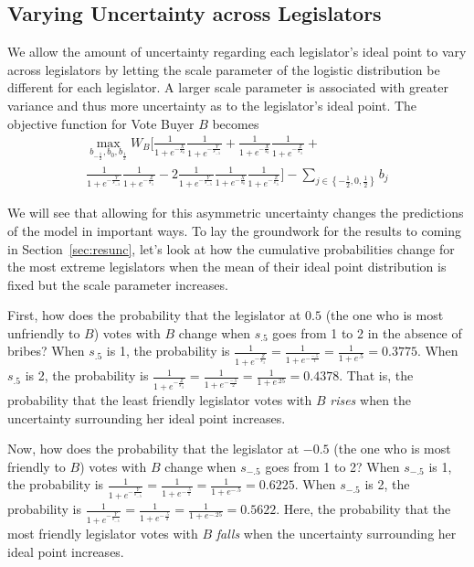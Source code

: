 \documentclass[12pt]{article}
\begin{document}
\subsection{Varying Uncertainty across Legislators}
\label{sec:uncert}
We allow the amount of uncertainty regarding each legislator's ideal point to vary across legislators by letting the scale parameter of the logistic distribution be different for each legislator. A larger scale parameter is associated with greater variance and thus more uncertainty as to the legislator's ideal point. The objective function for Vote Buyer $B$ becomes
 \begin{multline}
    \max_{b_{-\frac{1}{2}}, b_0, b_{\frac{1}{2}}} 
					W_B \biggl[ \frac{1}{1+e^{-\frac{X}{s_0}}} \frac{1}{1+e^{-\frac{Y}{s_{-.5}}}} +
					\frac{1}{1+e^{-\frac{X}{s_0}}} \frac{1}{1+e^{-\frac{Z}{s_{.5}}}} + \\
					\frac{1}{1+e^{-\frac{Y}{s_{-.5}}}} \frac{1}{1+e^{-\frac{Z}{s_{.5}}}} - 2	\frac{1}{1+e^{-\frac{Y}{s_{-.5}}}} \frac{1}{1+e^{-\frac{X}{s_0}}} \frac{1}{1+e^{-\frac{Z}{s_{.5}}}} \biggr] - \sum_{j\in \left\{-\frac{1}{2}, 0,\frac{1}{2}\right\}} b_j
	\end{multline}

We will see that allowing for this asymmetric uncertainty changes the predictions of the model in important ways. To lay the groundwork for the results to coming in Section~\ref{sec:resunc}, let's look at how the cumulative probabilities change for the most extreme legislators when the mean of their ideal point distribution is fixed but the scale parameter increases.

First, how does the probability that the legislator at $0.5$ (the one who is most unfriendly to $B$) votes with $B$ change when $s_{.5}$ goes from 1 to 2 in the absence of bribes? When $s_{.5}$ is 1, the probability is $\frac{1}{1+e^{-\frac{Z}{s_{.5}}}} = \frac{1}{1+e^{-\frac{-.5}{1}}} = \frac{1}{1+e^{.5}} = 0.3775$. When $s_{.5}$ is 2, the probability is $\frac{1}{1+e^{-\frac{Z}{s_{.5}}}} = \frac{1}{1+e^{-\frac{-.5}{2}}} = \frac{1}{1+e^{.25}} = 0.4378$. That is, the probability that the least friendly legislator votes with $B$ \textit{rises} when the uncertainty surrounding her ideal point increases.

Now, how does the probability that the legislator at $-0.5$ (the one who is most friendly to $B$) votes with $B$ change when $s_{-.5}$ goes from 1 to 2? When $s_{-.5}$ is 1, the probability is $\frac{1}{1+e^{-\frac{Y}{s_{-.5}}}} = \frac{1}{1+e^{-\frac{.5}{1}}} = \frac{1}{1+e^{-.5}} = 0.6225$. When $s_{-.5}$ is 2, the probability is $\frac{1}{1+e^{-\frac{Y}{s_{-.5}}}} = \frac{1}{1+e^{-\frac{.5}{2}}} = \frac{1}{1+e^{-.25}} = 0.5622$. Here, the probability that the most friendly legislator votes with $B$ \textit{falls} when the uncertainty surrounding her ideal point increases.
\end{document}

